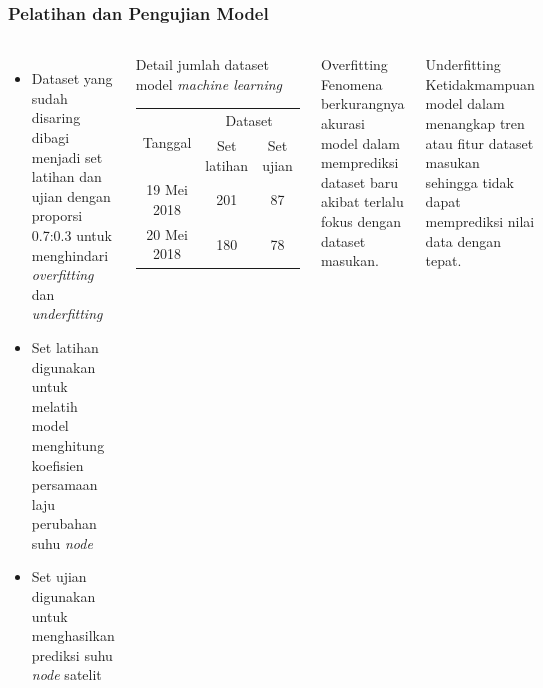 \documentclass[8pt]{beamer}
\begin{document}
\begin{frame}
  \frametitle{Pelatihan dan Pengujian Model}
  \begin{columns}[T]
      \begin{itemize}
        \item Dataset yang sudah disaring dibagi menjadi set latihan dan ujian dengan proporsi 0.7:0.3 untuk menghindari \textit{overfitting} dan \textit{underfitting}
        \item Set latihan digunakan untuk melatih model menghitung koefisien persamaan laju perubahan suhu \textit{node}
        \item Set ujian digunakan untuk menghasilkan prediksi suhu \textit{node} satelit
      \end{itemize}
          \begin{block}{\center Detail jumlah dataset model \textit{machine learning}}
      \begin{table}[H]
        \begin{center}
          \label{table:dataset}
          \begin{tabular}{|c|cc|}
            \hline
            \multirow{2}{*}{Tanggal} & \multicolumn{2}{c|}{Dataset}                 \\ \cline{2-3} 
             & \multicolumn{1}{c|}{Set latihan} & Set ujian \\ \hline
            19 Mei 2018              & \multicolumn{1}{c|}{201}         & 87        \\ \hline
            20 Mei 2018              & \multicolumn{1}{c|}{180}         & 78        \\ \hline
          \end{tabular}
        \end{center}
      \end{table}
          \end{block}
    \begin{block}{\center \normalsize Overfitting}
      \small
    Fenomena berkurangnya akurasi model dalam memprediksi dataset baru akibat
    terlalu fokus dengan dataset masukan.
    \end{block}
    \begin{block}{\center \normalsize Underfitting}
      \small
      Ketidakmampuan model dalam menangkap tren atau fitur dataset masukan
      sehingga tidak dapat memprediksi nilai data dengan tepat.
    \end{block}
  \end{columns}
\end{frame}
\end{document}
